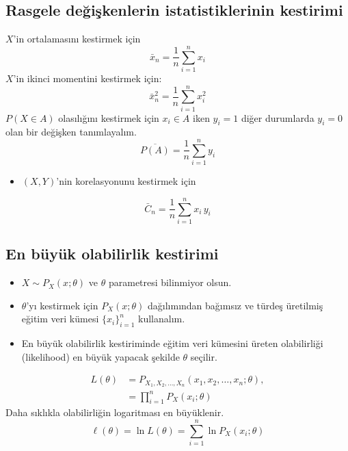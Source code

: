 \documentclass[11pt,a4paper]{article}
\begin{document}
\subsection{Rasgele değişkenlerin istatistiklerinin kestirimi}
$X$'in ortalamasını kestirmek için
\[ \bar{x}_n=\frac{1}{n}\sum_{i=1}^{n}x_i \]
$X$'in ikinci momentini kestirmek için:
\[ \bar{x}_n^{2}=\frac{1}{n}\sum_{i=1}^{n}x_i^2 \]
$P(X\in A)$ olasılığını kestirmek için $x_i\in A$ iken $y_i=1$ diğer durumlarda $y_i=0$ olan bir değişken tanımlayalım.
\[ \overline{P(A)}=\frac{1}{n}\sum_{i=1}^{n}y_i \]
\begin{itemize}
  \item $(X,Y)$'nin korelasyonunu kestirmek için
\end{itemize}
\[ \bar{C}_n=\frac{1}{n}\sum_{i=1}^{n}x_i\,y_i \]

\subsection{En büyük olabilirlik kestirimi}
\begin{itemize}
  \item $X\sim P_X(x;\theta)$ ve $\theta$ parametresi bilinmiyor olsun.
  \item $\theta$'yı kestirmek için $P_X(x;\theta)$ dağılımından bağımsız ve türdeş üretilmiş eğitim veri kümesi $\{x_i\}_{i=1}^{n}$ kullanalım.
  \item En büyük olabilirlik kestiriminde eğitim veri kümesini üreten olabilirliği (likelihood) en büyük yapacak şekilde $\theta$ seçilir.
\end{itemize}
\begin{align*}
  L(\theta) &= P_{X_1,X_2,\ldots,X_n}(x_1,x_2,\ldots,x_n;\theta),\\
  &= \prod_{i=1}^{n}P_X(x_i;\theta)
\end{align*}
Daha sıklıkla olabilirliğin logaritması en büyüklenir.
\[ \ell(\theta)=\ln L(\theta)=\sum_{i=1}^{n}\ln P_X(x_i;\theta) \]

\end{document}
